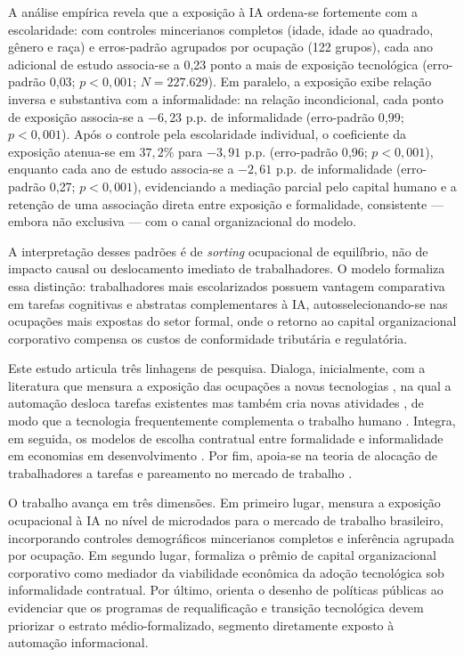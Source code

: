 A análise empírica revela que a exposição à IA ordena-se fortemente com a escolaridade: com controles mincerianos completos (idade, idade ao quadrado, gênero e raça) e erros-padrão agrupados por ocupação (122 grupos), cada ano adicional de estudo associa-se a 0{,}23 ponto a mais de exposição tecnológica (erro-padrão 0{,}03; $p < 0{,}001$; $N = 227.629$). Em paralelo, a exposição exibe relação inversa e substantiva com a informalidade: na relação incondicional, cada ponto de exposição associa-se a $-6{,}23$ p.p. de informalidade (erro-padrão 0{,}99; $p < 0{,}001$). Após o controle pela escolaridade individual, o coeficiente da exposição atenua-se em $37{,}2\%$ para $-3{,}91$ p.p. (erro-padrão 0{,}96; $p < 0{,}001$), enquanto cada ano de estudo associa-se a $-2{,}61$ p.p. de informalidade (erro-padrão 0{,}27; $p < 0{,}001$), evidenciando a mediação parcial pelo capital humano e a retenção de uma associação direta entre exposição e formalidade, consistente --- embora não exclusiva --- com o canal organizacional do modelo.

A interpretação desses padrões é de \emph{sorting} ocupacional de equilíbrio, não de impacto causal ou deslocamento imediato de trabalhadores. O modelo formaliza essa distinção: trabalhadores mais escolarizados possuem vantagem comparativa em tarefas cognitivas e abstratas complementares à IA, autosselecionando-se nas ocupações mais expostas do setor formal, onde o retorno ao capital organizacional corporativo compensa os custos de conformidade tributária e regulatória.

Este estudo articula três linhagens de pesquisa. Dialoga, inicialmente, com a literatura que mensura a exposição das ocupações a novas tecnologias \citep{frey2017future,acemoglu2018race,acemoglu2022tasks,eloundou2024gpts}, na qual a automação desloca tarefas existentes mas também cria novas atividades \citep{acemoglu2019automation}, de modo que a tecnologia frequentemente complementa o trabalho humano \citep{autor2015why}. Integra, em seguida, os modelos de escolha contratual entre formalidade e informalidade em economias em desenvolvimento \citep{ulyssea2018firms}. Por fim, apoia-se na teoria de alocação de trabalhadores a tarefas e pareamento no mercado de trabalho \citep{acemoglu2011skills,autordorn2013growth}.

O trabalho avança em três dimensões. Em primeiro lugar, mensura a exposição ocupacional à IA no nível de microdados para o mercado de trabalho brasileiro, incorporando controles demográficos mincerianos completos e inferência agrupada por ocupação. Em segundo lugar, formaliza o prêmio de capital organizacional corporativo como mediador da viabilidade econômica da adoção tecnológica sob informalidade contratual. Por último, orienta o desenho de políticas públicas ao evidenciar que os programas de requalificação e transição tecnológica devem priorizar o estrato médio-formalizado, segmento diretamente exposto à automação informacional.

